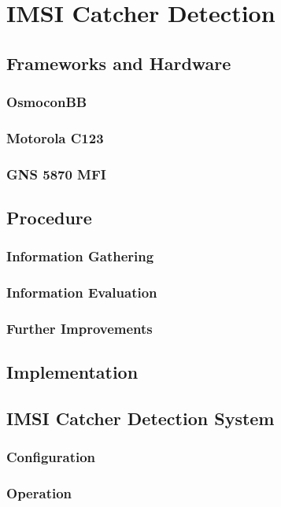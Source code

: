 \chapter{IMSI Catcher Detection}
\section{Frameworks and Hardware}
\subsection{OsmoconBB}
\subsection{Motorola C123}
\subsection{GNS 5870 MFI}
\section{Procedure}
\subsection{Information Gathering}
\label{sec:info_gathering}
\subsection{Information Evaluation}
\subsection{Further Improvements}
\section{Implementation}
\section{IMSI Catcher Detection System}
\subsection{Configuration}
\subsection{Operation}